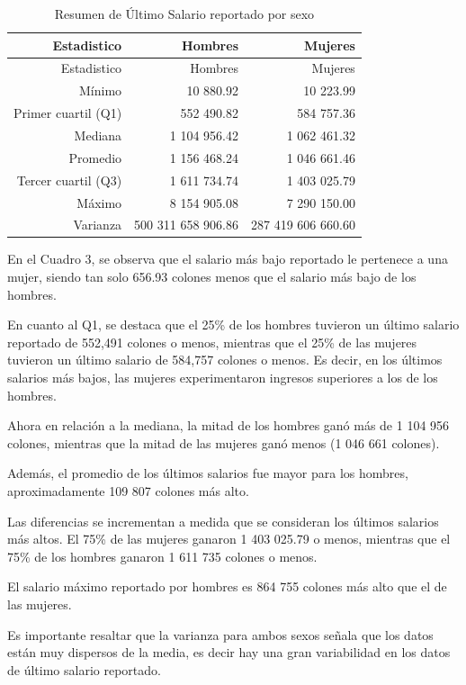\documentclass[
]{article}
\begin{document}
\begin{longtable}[]{@{}rrr@{}}
\caption{Resumen de Último Salario reportado por sexo}\tabularnewline
\toprule\noalign{}
Estadistico & Hombres & Mujeres \\
\midrule\noalign{}
\endfirsthead
\toprule\noalign{}
Estadistico & Hombres & Mujeres \\
\midrule\noalign{}
\endhead
\bottomrule\noalign{}
\endlastfoot
Mínimo & 10 880.92 & 10 223.99 \\
Primer cuartil (Q1) & 552 490.82 & 584 757.36 \\
Mediana & 1 104 956.42 & 1 062 461.32 \\
Promedio & 1 156 468.24 & 1 046 661.46 \\
Tercer cuartil (Q3) & 1 611 734.74 & 1 403 025.79 \\
Máximo & 8 154 905.08 & 7 290 150.00 \\
Varianza & 500 311 658 906.86 & 287 419 606 660.60 \\
\end{longtable}

En el Cuadro 3, se observa que el salario más bajo reportado le
pertenece a una mujer, siendo tan solo 656.93 colones menos que el
salario más bajo de los hombres.

En cuanto al Q1, se destaca que el 25\% de los hombres tuvieron un
último salario reportado de 552,491 colones o menos, mientras que el
25\% de las mujeres tuvieron un último salario de 584,757 colones o
menos. Es decir, en los últimos salarios más bajos, las mujeres
experimentaron ingresos superiores a los de los hombres.

Ahora en relación a la mediana, la mitad de los hombres ganó más de 1
104 956 colones, mientras que la mitad de las mujeres ganó menos (1 046
661 colones).

Además, el promedio de los últimos salarios fue mayor para los hombres,
aproximadamente 109 807 colones más alto.

Las diferencias se incrementan a medida que se consideran los últimos
salarios más altos. El 75\% de las mujeres ganaron 1 403 025.79 o menos,
mientras que el 75\% de los hombres ganaron 1 611 735 colones o menos.

El salario máximo reportado por hombres es 864 755 colones más alto que
el de las mujeres.

Es importante resaltar que la varianza para ambos sexos señala que los
datos están muy dispersos de la media, es decir hay una gran
variabilidad en los datos de último salario reportado.
\end{document}

